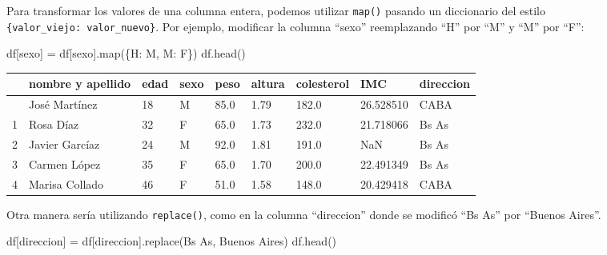 \documentclass[
  letterpaper,
  DIV=11,
  numbers=noendperiod]{scrreprt}
\newenvironment{Shaded}{\begin{snugshade}}{\end{snugshade}}
\newcommand{\BuiltInTok}[1]{\textcolor[rgb]{0.00,0.23,0.31}{#1}}
\newcommand{\NormalTok}[1]{\textcolor[rgb]{0.00,0.23,0.31}{#1}}
\newcommand{\OperatorTok}[1]{\textcolor[rgb]{0.37,0.37,0.37}{#1}}
\newcommand{\StringTok}[1]{\textcolor[rgb]{0.13,0.47,0.30}{#1}}
\begin{document}
Para transformar los valores de una columna entera, podemos utilizar
\texttt{map()} pasando un diccionario del estilo
\texttt{\{valor\_viejo:\ valor\_nuevo\}}. Por ejemplo, modificar la
columna ``sexo'' reemplazando ``H'' por ``M'' y ``M'' por ``F'':

\begin{Shaded}
\begin{Highlighting}[]
\NormalTok{df[}\StringTok{\textquotesingle{}sexo\textquotesingle{}}\NormalTok{] }\OperatorTok{=}\NormalTok{ df[}\StringTok{\textquotesingle{}sexo\textquotesingle{}}\NormalTok{].}\BuiltInTok{map}\NormalTok{(\{}\StringTok{\textquotesingle{}H\textquotesingle{}}\NormalTok{: }\StringTok{\textquotesingle{}M\textquotesingle{}}\NormalTok{, }\StringTok{\textquotesingle{}M\textquotesingle{}}\NormalTok{: }\StringTok{\textquotesingle{}F\textquotesingle{}}\NormalTok{\})}
\NormalTok{df.head()}
\end{Highlighting}
\end{Shaded}

\begin{longtable}[]{@{}lllllllll@{}}
\toprule\noalign{}
& nombre y apellido & edad & sexo & peso & altura & colesterol & IMC &
direccion \\
\midrule\noalign{}
\endhead
\bottomrule\noalign{}
\endlastfoot
0 & José Martínez & 18 & M & 85.0 & 1.79 & 182.0 & 26.528510 & CABA \\
1 & Rosa Díaz & 32 & F & 65.0 & 1.73 & 232.0 & 21.718066 & Bs As \\
2 & Javier Garcíaz & 24 & M & 92.0 & 1.81 & 191.0 & NaN & Bs As \\
3 & Carmen López & 35 & F & 65.0 & 1.70 & 200.0 & 22.491349 & Bs As \\
4 & Marisa Collado & 46 & F & 51.0 & 1.58 & 148.0 & 20.429418 & CABA \\
\end{longtable}

Otra manera sería utilizando \texttt{replace()}, como en la columna
``direccion'' donde se modificó ``Bs As'' por ``Buenos Aires''.

\begin{Shaded}
\begin{Highlighting}[]
\NormalTok{df[}\StringTok{\textquotesingle{}direccion\textquotesingle{}}\NormalTok{] }\OperatorTok{=}\NormalTok{ df[}\StringTok{\textquotesingle{}direccion\textquotesingle{}}\NormalTok{].replace(}\StringTok{\textquotesingle{}Bs As\textquotesingle{}}\NormalTok{, }\StringTok{\textquotesingle{}Buenos Aires\textquotesingle{}}\NormalTok{)}
\NormalTok{df.head()}
\end{Highlighting}
\end{Shaded}
\end{document}
